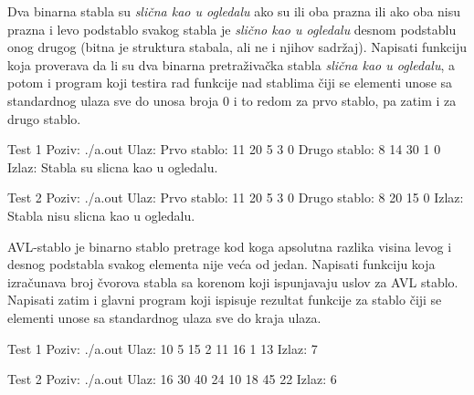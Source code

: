 \begin{Exercise}[label=713, difficulty=1]
Dva binarna stabla su {\em slična kao u ogledalu} ako su ili oba prazna ili ako oba nisu prazna i levo podstablo svakog stabla je {\em slično kao u ogledalu} desnom podstablu onog drugog (bitna je struktura stabala, ali ne i njihov sadržaj). Napisati funkciju koja proverava da li su dva binarna pretraživačka stabla {\em slična kao u ogledalu}, a potom i program koji testira rad funkcije nad stablima čiji se elementi unose sa standardnog ulaza sve do unosa broja 0 i to redom za prvo stablo, pa zatim i za drugo stablo. 

\begin{miditest}
\begin{test}{Test 1}
Poziv: ./a.out
Ulaz: 
	Prvo stablo: 11 20 5 3 0
	Drugo stablo: 8 14 30 1 0
Izlaz: 
	Stabla su slicna kao u ogledalu.
\end{test}
\end{miditest}

\begin{miditest}
\begin{test}{Test 2}
Poziv: ./a.out
Ulaz: 
	Prvo stablo: 11 20 5 3 0
	Drugo stablo: 8 20 15 0
Izlaz: 
	Stabla nisu slicna kao u ogledalu.
\end{test}
\end{miditest}
\end{Exercise}

\begin{Answer}[ref=713]
\end{Answer}


\begin{Exercise}[label=714]
AVL-stablo je binarno stablo pretrage kod koga apsolutna razlika visina levog i desnog podstabla svakog elementa
nije veća od jedan. Napisati funkciju  koja izračunava broj čvorova stabla sa korenom  koji ispunjavaju uslov za AVL stablo. Napisati zatim i glavni program koji ispisuje rezultat  funkcije za stablo čiji se elementi unose sa standardnog ulaza sve do kraja ulaza.

\begin{miditest}
\begin{test}{Test 1}
Poziv: ./a.out
Ulaz: 
	10 5 15 2 11 16 1 13
Izlaz: 
	7
\end{test}
\end{miditest}
\begin{miditest}
\begin{test}{Test 2}
Poziv: ./a.out
Ulaz: 
	16 30 40 24 10 18 45 22
Izlaz: 
	6
\end{test}
\end{miditest}
\end{Exercise}


